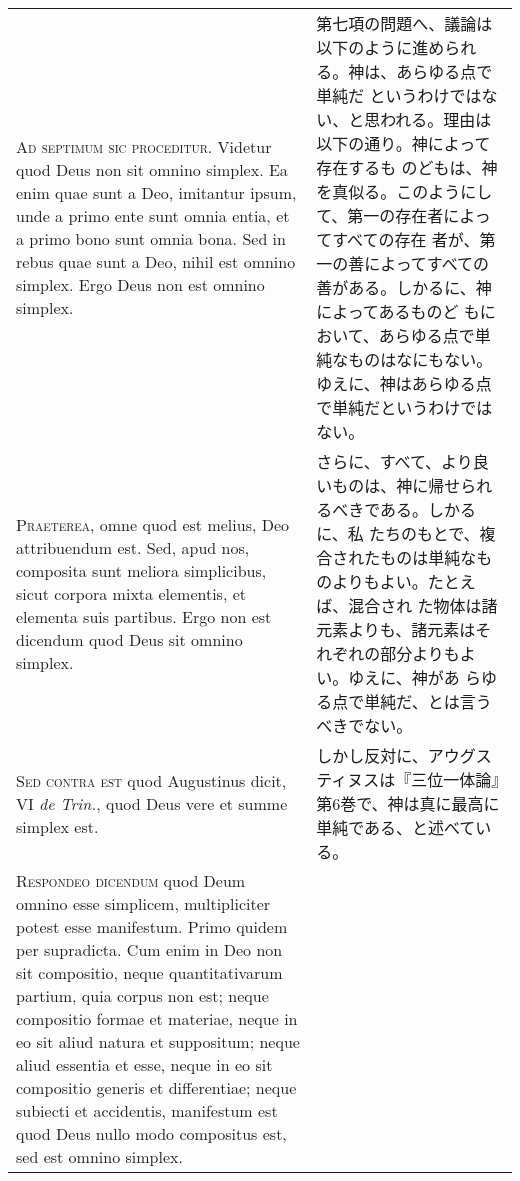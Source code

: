 \documentclass[10pt]{jsarticle}
\begin{document}
\begin{longtable}{p{21em}p{21em}}

{\huge A}{\scshape d septimum sic proceditur}. Videtur quod Deus non
 sit omnino simplex. Ea enim quae sunt a Deo, imitantur ipsum, unde a
 primo ente sunt omnia entia, et a primo bono sunt omnia bona. Sed in
 rebus quae sunt a Deo, nihil est omnino simplex. Ergo Deus non est
 omnino simplex.

&

第七項の問題へ、議論は以下のように進められる。神は、あらゆる点で単純だ
というわけではない、と思われる。理由は以下の通り。神によって存在するも
のどもは、神を真似る。このようにして、第一の存在者によってすべての存在
者が、第一の善によってすべての善がある。しかるに、神によってあるものど
もにおいて、あらゆる点で単純なものはなにもない。ゆえに、神はあらゆる点
で単純だというわけではない。

\\

{\scshape Praeterea}, omne quod est melius, Deo attribuendum est. Sed,
 apud nos, composita sunt meliora simplicibus, sicut corpora mixta
 elementis, et elementa suis partibus. Ergo non est dicendum quod Deus
 sit omnino simplex.

&


さらに、すべて、より良いものは、神に帰せられるべきである。しかるに、私
たちのもとで、複合されたものは単純なものよりもよい。たとえば、混合され
た物体は諸元素よりも、諸元素はそれぞれの部分よりもよい。ゆえに、神があ
らゆる点で単純だ、とは言うべきでない。

\\

{\scshape Sed contra est} quod Augustinus dicit, VI {\itshape de
 Trin.}, quod Deus vere et summe simplex est.

&

しかし反対に、アウグスティヌスは『三位一体論』第6巻で、神は真に最高に
単純である、と述べている。

\\

{\scshape Respondeo dicendum} quod Deum omnino esse simplicem,
 multipliciter potest esse manifestum. Primo quidem per
 supradicta. Cum enim in Deo non sit compositio, neque quantitativarum
 partium, quia corpus non est; neque compositio formae et materiae,
 neque in eo sit aliud natura et suppositum; neque aliud essentia et
 esse, neque in eo sit compositio generis et differentiae; neque
 subiecti et accidentis, manifestum est quod Deus nullo modo
 compositus est, sed est omnino simplex.


\end{longtable}
\end{document}
